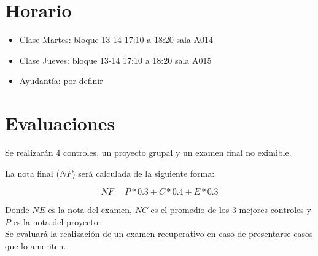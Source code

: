  \section{Horario}
\begin{itemize}
    \item Clase Martes: bloque 13-14 17:10 a 18:20 sala A014
  \item Clase Jueves: bloque 13-14 17:10 a 18:20 sala A015
  \item Ayudantía: por definir
\end{itemize}

 \section{Evaluaciones}
 
 Se realizarán 4 controles, un proyecto grupal y un examen final no eximible. 
 
La nota final ($NF$) será calculada de la siguiente forma:

\begin{equation}
     NF=P*0.3 + C*0.4 + E*0.3
\end{equation}

Donde $NE$ es la nota del examen, $NC$ es el promedio de los 3 mejores controles y $P$ es la nota del proyecto.\\

Se evaluará la realización de un examen recuperativo en caso de presentarse casos que lo ameriten.